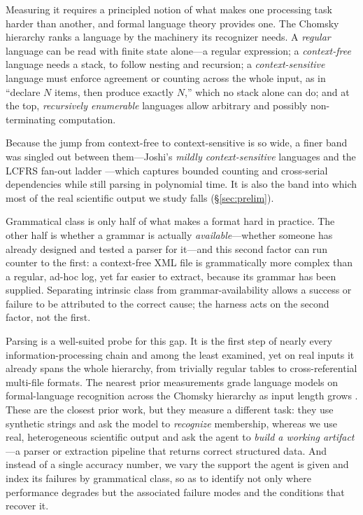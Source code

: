 \documentclass{article}
\newif\ifshowtheme\showthemefalse
\newcommand{\theme}[1]{\ifshowtheme{\normalfont\sffamily\footnotesize\color{gray}[\,#1\,]\ }\fi}
\begin{document}
\theme{complexity hierarchy}Measuring it requires a principled notion of what makes one
processing task harder than another, and formal language theory provides one. The
Chomsky hierarchy \citep{chomsky1956} ranks a language by the machinery its recognizer
needs. A \emph{regular} language can be read with finite state alone---a regular
expression; a \emph{context-free} language needs a stack, to follow nesting and
recursion; a \emph{context-sensitive} language must enforce agreement or counting
across the whole input, as in ``declare $N$ items, then produce exactly $N$,'' which no
stack alone can do; and at the top, \emph{recursively enumerable} languages allow
arbitrary and possibly non-terminating computation.

\theme{mildly context-sensitive}Because the jump from context-free to context-sensitive
is so wide, a finer band was singled out between them---Joshi's
\emph{mildly context-sensitive} languages \citep{joshi1985} and the LCFRS fan-out
ladder \citep{seki1991}---which captures bounded counting and cross-serial
dependencies while still parsing in polynomial time. It is also the band into which
most of the real scientific output we study falls (\S\ref{sec:prelim}).

\theme{grammar-availability}Grammatical class is only half of what makes a format hard
in practice. The other half is whether a grammar is actually \emph{available}---whether
someone has already designed and tested a parser for it---and this second factor can run
counter to the first: a context-free XML file is grammatically more complex than a
regular, ad-hoc log, yet far easier to extract, because its grammar has been supplied.
Separating intrinsic class from grammar-availability allows a success or failure to
be attributed to the correct cause; the harness acts on the second factor, not the
first.

\theme{parsing as probe}Parsing is a well-suited probe for this gap. It
is the first step of nearly every information-processing chain and among the least examined,
yet on real inputs it already spans the whole hierarchy, from trivially regular tables
to cross-referential multi-file formats. The nearest prior measurements grade language
models on formal-language recognition across the Chomsky hierarchy as input length
grows \citep{chomskybench, relic}. These are the closest prior work, but they measure a
different task: they use synthetic strings and ask the model to \emph{recognize}
membership, whereas we use real, heterogeneous scientific output and ask the agent to
\emph{build a working
artifact}---a parser or extraction pipeline that returns correct structured data. And
instead of a single accuracy number, we vary the support the agent is given and index
its failures by grammatical class, so as to identify not only where performance degrades
but the associated failure modes and the conditions that recover it.
\end{document}
